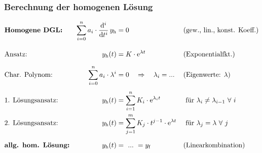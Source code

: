 \subsubsection{Berechnung der homogenen Lösung}
\label{sec:grundlagen:dgl:homogeneloesung}
\begin{frame}\ftx{\subsubsecname}
\b{%
    \begin{align*}
        &\textbf{Homogene DGL:}& 
            \sum_{i=0}^{n} a_i \cdot \dt[i]\, y_{\mathrm{h}} &= 0 &
            &\text{(gew., lin., konst. Koeff.)}\vphantom{\bigg|}\\[4pt]
        &\text{Ansatz:}&
            y_{\mathrm{h}}(t) &= K \cdot \mathrm{e}^{\lambda t} &
            &\text{(Exponentialfkt.)}\vphantom{\bigg|}\\
        &\text{Char. Polynom:}&
            \sum_{i=0}^{n} a_i \cdot \lambda^i &= 0 \quad\Rightarrow\quad \lambda_i = ... &
            &\text{(Eigenwerte: $\lambda$)} \\[4pt]
        &\text{1. Lösungsansatz:}&
            y_{\mathrm{h}}(t) &= \sum_{i=1}^{n} K_i \cdot \mathrm{e}^{\lambda_i t} &
            &\text{ für $\lambda_i \neq \lambda_{i-1} \ \forall \ i$} \\
        &\text{2. Lösungsansatz:}&
            y_{\mathrm{h}}(t)&= \sum_{j=1}^{m} K_j \cdot t^{j-1}  \cdot \mathrm{e}^{\lambda t} &
            &\text{ für $\lambda_j = \lambda \ \forall \ j$}\\[6pt]
        &\textbf{allg. hom. Lösung:}&
            y_{\mathrm{h}}(t)&= \ ... \ = y_{\mathrm{f}} &
            &\text{(Linearkombination)}
    \end{align*}
}%
\end{frame}
